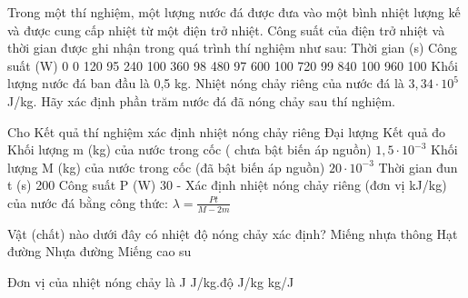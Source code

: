 \begin{ex}
Trong một thí nghiệm, một lượng nước đá được đưa vào một bình nhiệt lượng kế và được cung cấp nhiệt từ một điện trở nhiệt. Công suất của điện trở nhiệt và thời gian được ghi nhận trong quá trình thí nghiệm như sau:
Thời gian (s)	Công suất (W)
0	0
120	95
240	100
360	98
480	97
600	100
720	99
840	100
960	100
Khối lượng nước đá ban đầu là 0,5 kg. Nhiệt nóng chảy riêng của nước đá là $3,34 \cdot 10^5$ J/kg. Hãy xác định phần trăm nước đá đã nóng chảy sau thí nghiệm.
\end{ex}

\begin{ex}
Cho Kết quả thí nghiệm xác định nhiệt nóng chảy riêng
Đại lượng	Kết quả đo
Khối lượng m (kg) của nước trong cốc ( chưa bật biến áp nguồn)	$1,5 \cdot 10^{-3}$
Khối lượng M (kg) của nước trong cốc (đã bật biến áp nguồn)	$20 \cdot 10^{-3}$
Thời gian đun t (s)	200
Công suất P (W)	30
- Xác định nhiệt nóng chảy riêng (đơn vị kJ/kg) của nước đá bằng công thức:
$\lambda=\frac{Pt}{M-2m}$
\end{ex}
\begin{ex}
Vật (chất) nào dưới đây có nhiệt độ nóng chảy xác định?
\choice
{Miếng nhựa thông}
{\True Hạt đường}
{Nhựa đường}
{Miếng cao su}
\end{ex}

\begin{ex}
Đơn vị của nhiệt nóng chảy là
\choice
{\True J}
{J/kg.độ}
{J/kg}
{kg/J}
\end{ex}


